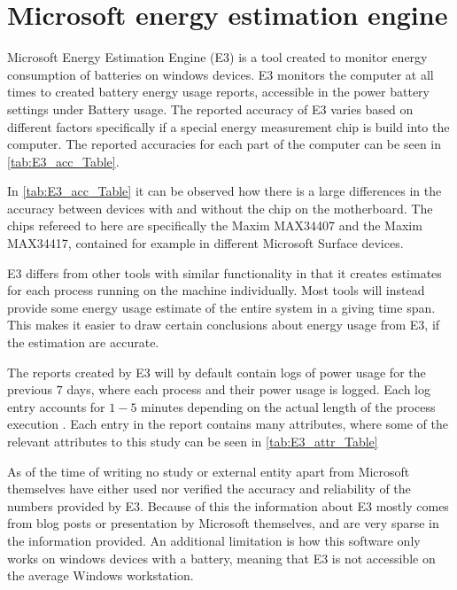\section{Microsoft energy estimation engine}
Microsoft Energy Estimation Engine (E3) is a tool created to monitor energy consumption of batteries on windows devices. E3 monitors the computer at all times to created battery energy usage reports, accessible in the power battery settings under Battery usage.\cite[p.43]{E3WinHec}
The reported accuracy of E3 varies based on different factors specifically if a special energy measurement chip is build into the computer. The reported accuracies for each part of the computer can be seen in \cref{tab:E3_acc_Table}. 



In \cref*{tab:E3_acc_Table} it can be observed how there is a large differences in the accuracy between devices with and without the chip on the motherboard. The chips refereed to here are specifically the Maxim MAX34407 and the Maxim MAX34417, contained for example in different Microsoft Surface devices.


E3 differs from other tools with similar functionality in that it creates estimates for each process running on the machine individually. Most tools will instead provide some energy usage estimate of the entire system in a giving time span. This makes it easier to draw certain conclusions about energy usage from E3, if the estimation are accurate. 

The reports created by E3 will by default contain logs of power usage for the previous $7$ days, where each process and their power usage is logged. Each log entry accounts for $1-5$ minutes depending on the actual length of the process execution \cite[]{E3Video}. Each entry in the report contains many attributes, where some of the relevant attributes to this study can be seen in \cref{tab:E3_attr_Table}



As of the time of writing no study or external entity apart from Microsoft themselves have either used nor verified the accuracy and reliability of the numbers provided by E3. Because of this the information about E3 mostly comes from blog posts or presentation by Microsoft themselves, and are very sparse in the information provided. An additional limitation is how this software only works on windows devices with a battery, meaning that E3 is not accessible on the average Windows workstation.

